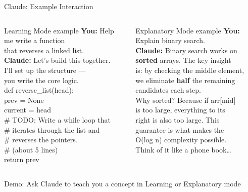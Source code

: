 \documentclass[aspectratio=169]{beamer}
\begin{document}
\begin{frame}{Claude: Example Interaction}

\begin{columns}[T]
\begin{block}{Learning Mode example}
\ttfamily\scriptsize
\textbf{You:} Help me write a function\\
that reverses a linked list.\\[4pt]
\textbf{Claude:} Let's build this together.\\
I'll set up the structure ---\\
you write the core logic.\\[4pt]
def reverse\_list(head):\\
\quad prev = None\\
\quad current = head\\
\quad \# TODO: Write a while loop that\\
\quad \# iterates through the list and\\
\quad \# reverses the pointers.\\
\quad \# (about 5 lines)\\
\quad return prev
\end{block}

\begin{block}{Explanatory Mode example}
\ttfamily\scriptsize
\textbf{You:} Explain binary search.\\[4pt]
\textbf{Claude:} Binary search works on\\
\textbf{sorted} arrays. The key insight\\
is: by checking the middle element,\\
we eliminate \textbf{half} the remaining\\
candidates each step.\\[4pt]
Why sorted? Because if arr[mid]\\
is too large, everything to its\\
right is also too large. This\\
guarantee is what makes the\\
O(log n) complexity possible.\\[4pt]
Think of it like a phone book\ldots
\end{block}
\end{columns}

\bigskip
\begin{center}
\small\color{violet1}
Demo: Ask Claude to teach you a concept in Learning or Explanatory mode
\end{center}
\end{frame}
\end{document}
